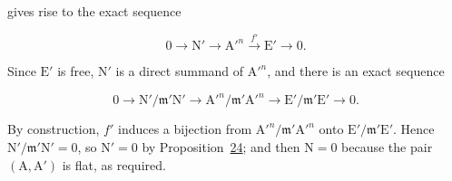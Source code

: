 gives rise to the exact sequence

\begin{equation*}
0\longrightarrow \mathrm{N}'\longrightarrow {\mathrm{A}'}^n
\xrightarrow{f'}\mathrm{E}'\longrightarrow0.
\end{equation*}

Since $\mathrm{E}'$ is free, $\mathrm{N}'$ is a direct summand of ${\mathrm{A}'}^n$, and there is an
exact sequence

\begin{equation*}
0\longrightarrow \mathrm{N}'/\mathfrak{m}'\mathrm{N}'
\longrightarrow {\mathrm{A}'}^n/\mathfrak{m}'{\mathrm{A}'}^n
\longrightarrow \mathrm{E}'/\mathfrak{m}'\mathrm{E}'\longrightarrow0.
\end{equation*}

By construction, $f'$ induces a bijection from
${\mathrm{A}'}^n/\mathfrak{m}'{\mathrm{A}'}^n$ onto $\mathrm{E}'/\mathfrak{m}'\mathrm{E}'$. Hence
$\mathrm{N}'/\mathfrak{m}'\mathrm{N}'=0$, so $\mathrm{N}'=0$ by
Proposition~\hyperref[gaga:prop:24]{24}; and then $\mathrm{N}=0$ because the pair
$(\mathrm{A},\mathrm{A}')$ is flat, as required.



